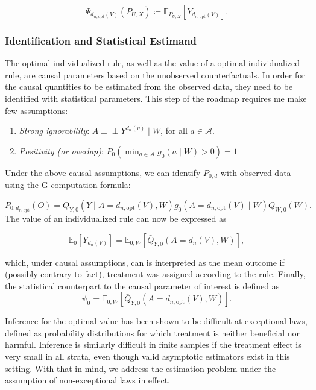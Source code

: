 \documentclass[12pt, krantz2,]{krantz}
\providecommand{\tightlist}{%
  \setlength{\itemsep}{0pt}\setlength{\parskip}{0pt}}
\theoremstyle{definition}
\theoremstyle{definition}
\theoremstyle{definition}
\newcommand{\E}{\mathbb{E}}
\newcommand{\1}{\mathbbm{1}}
\newcommand{\indep}{\mbox{$\perp\!\!\!\perp$}}
\begin{document}
\[\Psi_{d_{n, \text{opt}}(V)}(P_{U,X}) \coloneqq \E_{P_{U,X}}[Y_{d_{n,
\text{opt}}(V)}].\]

\hypertarget{identification-and-statistical-estimand}{%
\subsubsection{Identification and Statistical Estimand}\label{identification-and-statistical-estimand}}

The optimal individualized rule, as well as the value of a optimal
individualized rule, are causal parameters based on the unobserved
counterfactuals. In order for the causal quantities to be estimated from the
observed data, they need to be identified with statistical parameters. This step
of the roadmap requires me make few assumptions:

\begin{enumerate}
\def\labelenumi{\arabic{enumi}.}
\tightlist
\item
  \emph{Strong ignorability}: \(A \indep Y^{d_n(v)} \mid W\), for all \(a \in \mathcal{A}\).
\item
  \emph{Positivity (or overlap)}: \(P_0(\min_{a \in \mathcal{A}} g_0(a \mid W) > 0) = 1\)
\end{enumerate}

Under the above causal assumptions, we can identify \(P_{0,d}\) with observed data
using the G-computation formula:

\[P_{0,d_{n, \text{opt}}}(O) = Q_{Y,0}(Y \mid A=d_{n,\text{opt}}(V),W)
g_0(A=d_{n,\text{opt}}(V) \mid W)Q_{W,0}(W).\]
The value of an individualized rule can now be expressed as

\[\E_0[Y_{d_n(V)}] = \E_{0,W}[\bar{Q}_{Y,0}(A=d_n(V),W)],\]

which, under causal assumptions, can is interpreted as the mean outcome if
(possibly contrary to fact), treatment was assigned according to the rule.
Finally, the statistical counterpart to the causal parameter of interest is
defined as
\[\psi_0 = \E_{0,W}[\bar{Q}_{Y,0}(A=d_{n,\text{opt}}(V),W)].\]

Inference for the optimal value has been shown to be difficult at exceptional
laws, defined as probability distributions for which treatment is neither
beneficial nor harmful. Inference is similarly difficult in finite samples if
the treatment effect is very small in all strata, even though valid asymptotic
estimators exist in this setting. With that in mind, we address the estimation
problem under the assumption of non-exceptional laws in effect.
\end{document}
